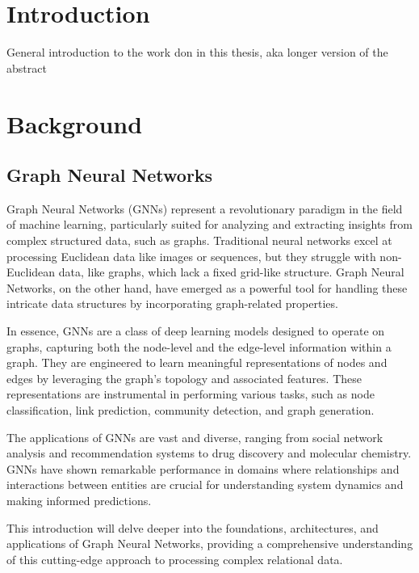 \documentclass[binding=0.6cm,LaM]{sapthesis}
\begin{document}
\tableofcontents
\mainmatter

\chapter{Introduction}
\label{chap:1} 
General introduction to the work don in this thesis, aka longer version of the abstract

\chapter{Background}
\label{chap:2}
\section{Graph Neural Networks}
\label{sec:gnns}
Graph Neural Networks (GNNs) represent a revolutionary paradigm in the field of machine learning, particularly suited for analyzing and extracting insights from complex structured data, such as graphs. Traditional neural networks excel at processing Euclidean data like images or sequences, but they struggle with non-Euclidean data, like graphs, which lack a fixed grid-like structure. Graph Neural Networks, on the other hand, have emerged as a powerful tool for handling these intricate data structures by incorporating graph-related properties.

In essence, GNNs are a class of deep learning models designed to operate on graphs, capturing both the node-level and the edge-level information within a graph. They are engineered to learn meaningful representations of nodes and edges by leveraging the graph's topology and associated features. These representations are instrumental in performing various tasks, such as node classification, link prediction, community detection, and graph generation.

The applications of GNNs are vast and diverse, ranging from social network analysis and recommendation systems to drug discovery and molecular chemistry. GNNs have shown remarkable performance in domains where relationships and interactions between entities are crucial for understanding system dynamics and making informed predictions.

This introduction will delve deeper into the foundations, architectures, and applications of Graph Neural Networks, providing a comprehensive understanding of this cutting-edge approach to processing complex relational data.
\end{document}
